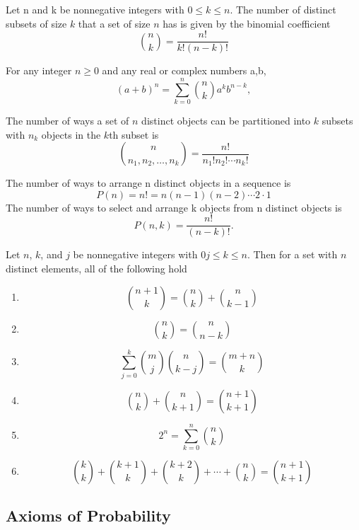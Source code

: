 \documentclass[../main.tex]{subfiles}
\begin{document}
\begin{theorem} \label{thm:binomial coefficient}
Let n and k be nonnegative integers with \( 0 \leq k \leq n\). The number of distinct subsets of size \(k\) that a set of size \(n\) has is given by the binomial coefficient
\[
\binom{n}{k} = \frac{n!}{k!(n-k)!}
\]

\end{theorem}

\begin{theorem} \label{thm:binomial theorem}
For any integer \(n \geq 0\) and any real or complex numbers a,b, 
\[
(a+b)^n = \sum^n_{k=0}{\binom{n}{k} a^{k}b^{n-k}},
\]


\end{theorem}

\begin{theorem}
The number of ways a set of $n$ distinct objects 
can be partitioned into $k$ subsets with 
$n_k$ objects in the $k$th subset is
\[
\binom{n}{n_1,n_2,\dots, n_k} = \frac{n!}{n_1!n_2!\cdots n_k!}
\]
\end{theorem}


\begin{theorem} \label{thm:permutations}
The number of ways to arrange n distinct objects in a sequence is 
\[
P(n) = n! = n(n-1)(n-2) \cdots 2 \cdot 1
\]
The number of ways to select and arrange k objects from n distinct objects is
\[
P(n,k) = \frac{n!}{(n-k)!}.
\]
\end{theorem}


\begin{theorem}
Let $n$, $k$, and $j$ be nonnegative integers with $0j\leq k \leq n$. 
Then for a set with $n$ distinct elements, all of the following hold
\begin{enumerate}
    \item \[\binom{n+1}{k} = \binom{n}{k} + \binom{n}{k-1}\]
    \item \[\binom{n}{k} = \binom{n}{n-k}\]
    \item \[\sum^k_{j=0}{\binom{m}{j}\binom{n}{k-j}} = \binom{m+n}{k}\]
    \item \[\binom{n}{k} + \binom{n}{k+1} = \binom{n+1}{k+1}\]
    \item \[2^n = \sum^n_{k=0}{\binom{n}{k}}\]
    \item \[\binom{k}{k}+ \binom{k+1}{k} + \binom{k+2}{k} + \cdots +\binom{n}{k} = \binom{n+1}{k+1}   \]
\end{enumerate}
\end{theorem}

\subsection{Axioms of Probability}
\end{document}
